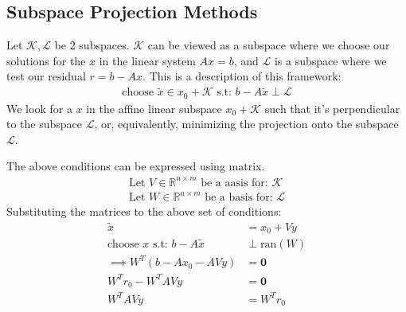 \documentclass[]{article}
\theoremstyle{definition}
\begin{document}
    \subsection{Subspace Projection Methods}\label{sec:Subspace_Projection_Methods}
        Let $\mathcal K, \mathcal L$ be 2 subspaces. $\mathcal K$ can be viewed as a subspace where we choose our solutions for the $x$ in the linear system $Ax = b$, and $\mathcal L$ is a subspace where we test our residual $r = b - Ax$. This is a description of this framework: 
        \begin{align}
            \text{choose }\tilde{x} \in x_0 + \mathcal{K} \text{ s.t: } b - A\tilde{x} \perp \mathcal{L}
        \end{align}
        We look for a $x$ in the affine linear subspace $x_0 + \mathcal{K}$ such that it's perpendicular to the subspace $\mathcal{L}$, or, equivalently, minimizing the projection onto the subspace $\mathcal{L}$.  
        \par
        The above conditions can be expressed using matrix. 
        \begin{align}
            \text{Let } V \in \mathbb{R}^{n\times m} \text{ be a aasis for: }\mathcal{K}
            \\
            \text{Let } W \in \mathbb{R}^{n\times m} \text{ be a basis for: } \mathcal{L}
        \end{align}
        Substituting the matrices to the above set of conditions: 
        \begin{align}
            \tilde{x} &= x_0 + Vy
            \\
            \text{choose } x \text{ s.t: } b - A\tilde{x}  &\perp \text{ran}(W)
            \\
            \implies W^T(b - Ax_0 - AVy) &= \mathbf{0}
            \\
            W^Tr_0 - W^TAVy&= \mathbf{0}
            \\
            W^TAVy &= W^Tr_0
        \end{align}
\end{document}
